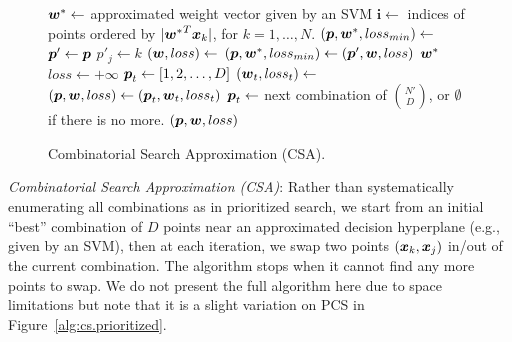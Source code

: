 \COMMENT

\begin{figure}[tp!]
\vspace{-3mm}
\caption{
Combinatorial Search Approximation (CSA).\hfill \; \\
}
\label{alg:cs.approximation}
{\footnotesize 
\begin{algorithmic}[1]
 
\State $\boldsymbol{w}^* \gets$ approximated weight vector given by an SVM
\State $\boldsymbol{i} \gets$ indices of points ordered by $|{\boldsymbol{w}^*}^T\boldsymbol{x}_k|$, for $k=1, \dots, N$.
\State $(\boldsymbol{p}, \boldsymbol{w}^*, loss_{min}) \gets$ 
\Loop
            \State $\boldsymbol{p}' \gets \boldsymbol{p}$
            \State $p'_j \gets k$
            \State $(\boldsymbol{w}, loss) \gets$ 
               \State $(\boldsymbol{p}, \boldsymbol{w}^*, loss_{min}) \gets (\boldsymbol{p}', \boldsymbol{w}, loss)$
            \EndIf
         \EndFor
      \EndIf
   \EndFor
   \State \Return $\boldsymbol{w}^*$
 \EndLoop
\Statex
{} 
   \State $loss \gets +\infty$
   \State $\boldsymbol{p}_t \gets [1,2,\dots,D]$
      \State $(\boldsymbol{w}_t, loss_t) \gets$ 
         \State $(\boldsymbol{p}, \boldsymbol{w}, loss) \gets (\boldsymbol{p}_t, \boldsymbol{w}_t, loss_t)$
      \EndIf
      \State $\boldsymbol{p}_t \gets $ next combination of ${N' \choose D}$, or $\emptyset$ if there is no more.
   \EndWhile
   \State \Return $(\boldsymbol{p}, \boldsymbol{w}, loss)$
\EndFunction
\Statex
\EndFunction
\end{algorithmic}}
\vspace{-4mm}
\end{figure}

\ENDCOMMENT

\noindent \emph{Combinatorial Search Approximation (CSA)}: Rather than
systematically enumerating all combinations as in prioritized search,
we start from an initial ``best'' combination of $D$ points near an
approximated decision hyperplane (e.g., given by an SVM), then at each
iteration, we swap two points $(\boldsymbol{x}_k, \boldsymbol{x}_j)$ in/out of the
current combination. The algorithm stops when it cannot find any more
points to swap.  We do not present the full algorithm here due to
space limitations but note that it is a slight variation on PCS 
in Figure~\ref{alg:cs.prioritized}.
